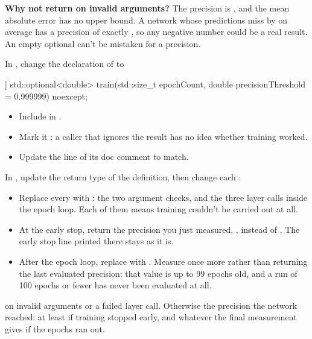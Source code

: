 \textbf{Why not return  on invalid arguments?} The precision is , and
the mean absolute error has no upper bound. A network whose predictions miss by  on
average has a precision of exactly , so any negative number could be a real result. An
empty optional can't be mistaken for a precision.

In , change the declaration of  to

\begin{cppcode}
[[nodiscard]] std::optional<double> train(std::size_t epochCount,
                                          double precisionThreshold = 0.999999) noexcept;
\end{cppcode}

\begin{itemize}
  \item Include  in .
  \item Mark it \code{[[nodiscard]]}: a caller that ignores the result has no idea whether
    training worked.
  \item Update the  line of its doc comment to match.
\end{itemize}

In , update the return type of the definition, then
change each :
\begin{itemize}
  \item Replace every  with : the two argument
    checks, and the three layer calls inside the epoch loop. Each of them means training couldn't
    be carried out at all.
  \item At the early stop, return the precision you just measured, , instead
    of . The early stop line printed there stays as it is.
  \item After the epoch loop, replace  with . Measure
    once more rather than returning the last evaluated precision: that value is up to 99 epochs
    old, and a run of 100 epochs or fewer has never been evaluated at all.
\end{itemize}

 on invalid arguments or a failed layer call. Otherwise the precision the
network reached: at least  if training stopped early, and whatever the
final measurement gives if the epochs ran out.

